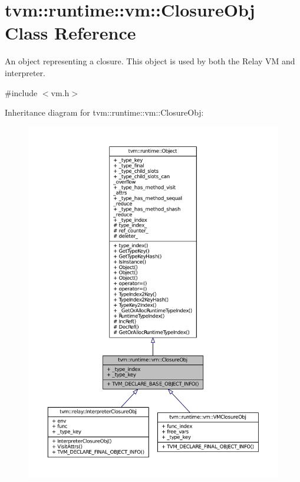 \hypertarget{classtvm_1_1runtime_1_1vm_1_1ClosureObj}{}\section{tvm\+:\+:runtime\+:\+:vm\+:\+:Closure\+Obj Class Reference}
\label{classtvm_1_1runtime_1_1vm_1_1ClosureObj}


An object representing a closure. This object is used by both the Relay VM and interpreter.  




{\ttfamily \#include $<$vm.\+h$>$}



Inheritance diagram for tvm\+:\+:runtime\+:\+:vm\+:\+:Closure\+Obj\+:
\nopagebreak
\begin{figure}[H]
\begin{center}
\leavevmode
\includegraphics[width=350pt]{classtvm_1_1runtime_1_1vm_1_1ClosureObj__inherit__graph}
\end{center}
\end{figure}


